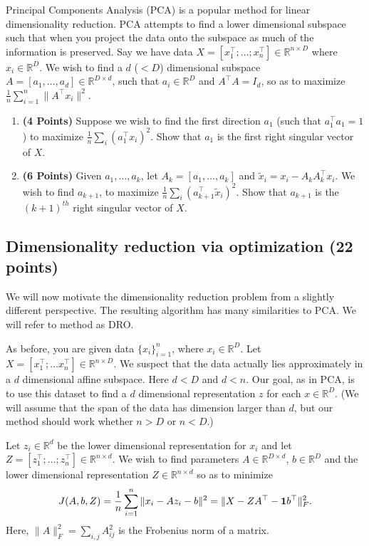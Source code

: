 \documentclass[a4paper]{article}
\newcounter{thm}
\newcommand*{\one}{{\bf 1}}
\theoremstyle{definition}
\newcommand{\RR}{\mathbb{R}}
\begin{document}
Principal Components Analysis (PCA) is a popular method for linear dimensionality reduction. PCA attempts to find a lower dimensional subspace such that when you project the data onto the subspace as much of the information is preserved. Say we have data $X = [x_1^\top; \dots; x_n^\top] \in \RR^{n\times D}$ where  $x_i \in \RR^D$. We wish to find a $d$ ($ < D$) dimensional subspace $A = [a_1, \dots, a_d] \in \RR^{D\times d}$, such that $ a_i \in \RR^D$ and $A^\top A = I_d$, so as to maximize $\frac{1}{n} \sum_{i=1}^n \|A^\top x_i\|^2$.
\begin{enumerate}

	\item  \textbf{(4 Points)}
	      Suppose we wish to find the first direction $a_1$ (such that $a_1^\top a_1 = 1$) to maximize $\frac{1}{n} \sum_i (a_1^\top x_i)^2$.
	      Show that $a_1$ is the first right singular vector of $X$.

	\item  \textbf{(6 Points)}
	      Given $a_1, \dots, a_k$, let $A_k = [a_1, \dots, a_k]$ and
	      $\tilde{x}_i = x_i - A_kA_k^\top x_i$. We wish to find $a_{k+1}$, to maximize
	      $\frac{1}{n} \sum_i (a_{k+1}^\top \tilde{x}_i)^2$. Show that $a_{k+1}$ is the
	      $(k+1)^{th}$ right singular vector of $X$.


\end{enumerate}


\subsection{Dimensionality reduction via optimization (22 points)}

We will now motivate the dimensionality reduction problem from a slightly different
perspective. The resulting algorithm has many similarities to PCA.
We will refer to method as DRO.

As before, you are given data $\{x_i\}_{i=1}^n$, where $x_i \in \RR^D$. Let $X=[x_1^\top; \dots
	x_n^\top] \in \RR^{n\times D}$. We suspect that the data
actually lies approximately in  a $d$ dimensional affine subspace.
Here $d<D$ and $d<n$.
Our goal, as in PCA, is to use this dataset to find a $d$ dimensional representation $z$ for each $x\in\RR^D$.
(We will assume that the span of the data has dimension larger than
$d$, but our method should work whether $n>D$ or $n<D$.)


Let $z_i\in \RR^d$ be the lower dimensional representation for $x_i$ and
let $Z = [z_1^\top; \dots; z_n^\top] \in \RR^{n\times d}$.
We wish to find parameters $A \in \RR^{D\times d}$, $b\in\RR^D$ and the lower
dimensional representation $Z\in \RR^{n\times d}$ so as to minimize
\begin{equation}
	J(A,b,Z) = \frac{1}{n} \sum_{i=1}^n \|x_i - Az_i - b\|^2 = \| X - ZA^\top - \one b^\top\|_F^2.
	\label{eqn:dimobj}
\end{equation}
Here, $\|A\|^2_F = \sum_{i,j} A_{ij}^2$ is the Frobenius norm of a matrix.
\end{document}
